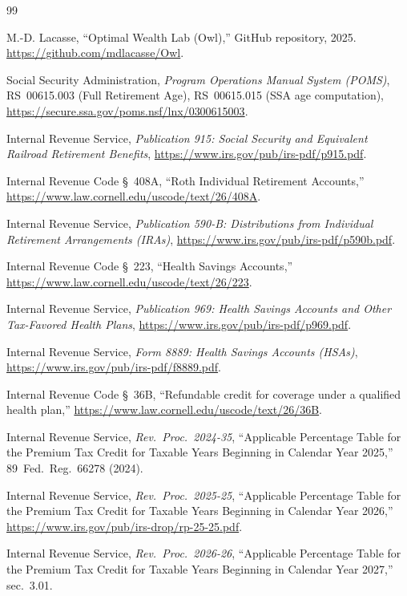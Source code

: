 \documentclass[fleqn,12pt]{report}
\begin{document}
\renewcommand{\bibname}{References}
\begin{thebibliography}{99}

M.-D. Lacasse,
``Optimal Wealth Lab (Owl),''
GitHub repository, 2025.
\url{https://github.com/mdlacasse/Owl}.

Social Security Administration,
\textit{Program Operations Manual System (POMS)},
RS~00615.003 (Full Retirement Age), RS~00615.015 (SSA age computation),
\url{https://secure.ssa.gov/poms.nsf/lnx/0300615003}.

Internal Revenue Service,
\textit{Publication 915: Social Security and Equivalent Railroad Retirement Benefits},
\url{https://www.irs.gov/pub/irs-pdf/p915.pdf}.

Internal Revenue Code \S~408A,
``Roth Individual Retirement Accounts,''
\url{https://www.law.cornell.edu/uscode/text/26/408A}.

Internal Revenue Service,
\textit{Publication 590-B: Distributions from Individual Retirement Arrangements (IRAs)},
\url{https://www.irs.gov/pub/irs-pdf/p590b.pdf}.

Internal Revenue Code \S~223,
``Health Savings Accounts,''
\url{https://www.law.cornell.edu/uscode/text/26/223}.

Internal Revenue Service,
\textit{Publication 969: Health Savings Accounts and Other Tax-Favored Health Plans},
\url{https://www.irs.gov/pub/irs-pdf/p969.pdf}.

Internal Revenue Service,
\textit{Form 8889: Health Savings Accounts (HSAs)},
\url{https://www.irs.gov/pub/irs-pdf/f8889.pdf}.

Internal Revenue Code \S~36B,
``Refundable credit for coverage under a qualified health plan,''
\url{https://www.law.cornell.edu/uscode/text/26/36B}.

Internal Revenue Service,
\textit{Rev.\ Proc.\ 2024-35},
``Applicable Percentage Table for the Premium Tax Credit for Taxable Years Beginning in Calendar Year 2025,'' 89~Fed.\ Reg.\ 66278 (2024).

Internal Revenue Service,
\textit{Rev.\ Proc.\ 2025-25},
``Applicable Percentage Table for the Premium Tax Credit for Taxable Years Beginning in Calendar Year 2026,'' \url{https://www.irs.gov/pub/irs-drop/rp-25-25.pdf}.

Internal Revenue Service,
\textit{Rev.\ Proc.\ 2026-26},
``Applicable Percentage Table for the Premium Tax Credit for Taxable Years Beginning in Calendar Year 2027,'' sec.~3.01.


\end{thebibliography}
\end{document}
